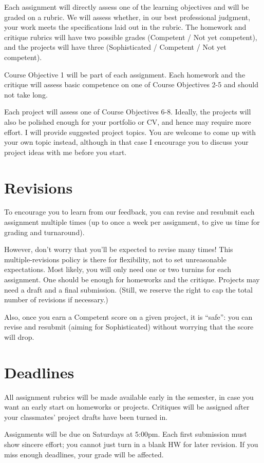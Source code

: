 \documentclass[12pt]{article}
\begin{document}
Each assignment will directly assess one of the learning objectives and will be graded on a rubric.
We will assess whether, in our best professional judgment, your work meets the specifications laid out in the rubric.
The homework and critique rubrics will have two possible grades (Competent / Not yet competent), and the projects will have three (Sophisticated / Competent / Not yet competent).

Course Objective 1 will be part of each assignment. Each homework and the critique will assess basic competence on one of Course Objectives 2-5 and should not take long.

Each project will assess one of Course Objectives 6-8. Ideally, the projects will also be polished enough for your portfolio or CV, and hence may require more effort. I will provide suggested project topics. You are welcome to come up with your own topic instead, although in that case I encourage you to discuss your project ideas with me before you start.

\section*{Revisions}
To encourage you to learn from our feedback, you can revise and resubmit each assignment multiple times (up to once a week per assignment, to give us time for grading and turnaround).

However, don't worry that you'll be expected to revise many times!
This multiple-revisions policy is there for flexibility, not to set unreasonable expectations.
Most likely, you will only need one or two turnins for each assignment. One should be enough for homeworks and the critique. Projects may need a draft and a final submission.
(Still, we reserve the right to cap the total number of revisions if necessary.)

Also, once you earn a Competent score on a given project, it is ``safe'': you can revise and resubmit (aiming for Sophisticated) without worrying that the score will drop.

\section*{Deadlines}
All assignment rubrics will be made available early in the semester, in case you want an early start on homeworks or projects. Critiques will be assigned after your classmates' project drafts have been turned in.

Assignments will be due on Saturdays at 5:00pm. Each first submission must show sincere effort; you cannot just turn in a blank HW for later revision. If you miss enough deadlines, your grade will be affected.
\end{document}
